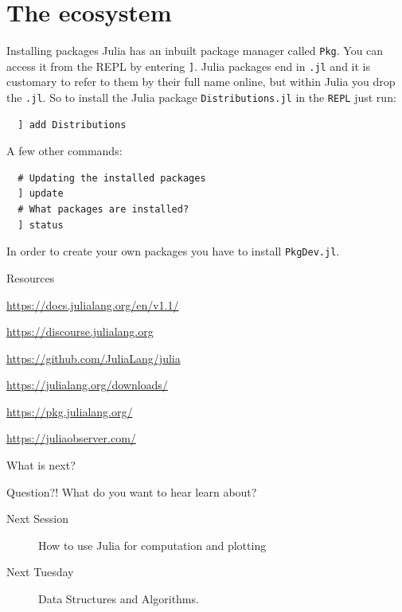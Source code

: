 \documentclass{beamer}
\begin{document}
\section{The ecosystem}
\begin{frame}[fragile]{Installing packages}
  Julia has an inbuilt package manager called \verb|Pkg|. You can access it from the REPL by entering \verb|]|. Julia packages end in \verb|.jl|
  and it is customary to refer to them by their full name online, but within Julia you drop the \verb|.jl|.
  So to install the Julia package \verb|Distributions.jl| in the \verb|REPL| just run:

  \begin{lstlisting}
  ] add Distributions
  \end{lstlisting}

  A few other commands:
  \begin{lstlisting}
  # Updating the installed packages
  ] update
  # What packages are installed?
  ] status
  \end{lstlisting}
  In order to create your own packages you have to install \verb|PkgDev.jl|.
\end{frame}
\begin{frame}{Resources}
\begin{description}
	\item[Documentation] \url{https://docs.julialang.org/en/v1.1/}
	\item[Forum] \url{https://discourse.julialang.org}
	\item[Issue Tracker] \url{https://github.com/JuliaLang/julia}
	\item[Downloads] \url{https://julialang.org/downloads/}
	\item[Packages] \url{https://pkg.julialang.org/}
	\item \url{https://juliaobserver.com/}
\end{description}
\end{frame}
\begin{frame}{What is next?}
  \begin{block}{Question?!}
    What do you want to hear learn about?
  \end{block}
  \begin{description}
    \item[Next Session] How to use Julia for computation and plotting
    \item[Next Tuesday] Data Structures and Algorithms.
  \end{description}
\end{frame}
\end{document}
